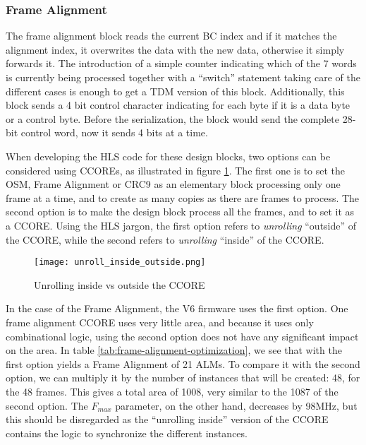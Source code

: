 \subsubsection{Frame Alignment}
The frame alignment block reads the current BC index and if it matches the alignment index, it overwrites the data with the new data, otherwise it simply forwards it. The introduction of a simple counter indicating which of the 7 words is currently being processed together with a ``switch'' statement taking care of the different cases is enough to get a TDM version of this block. Additionally, this block sends a 4 bit control character indicating for each byte if it is a data byte or a control byte. Before the serialization, the block would send the complete 28-bit control word, now it sends 4 bits at a time.

When developing the HLS code for these design blocks, two options can be considered using CCOREs, as illustrated in figure \ref{fig:unrolling-inside-outside}. The first one is to set the OSM, Frame Alignment or CRC9 as an elementary block processing only one frame at a time, and to create as many copies as there are frames to process. The second option is to make the design block process all the frames, and to set it as a CCORE. Using the HLS jargon, the first option refers to \textit{unrolling} ``outside'' of the CCORE, while the second refers to \textit{unrolling} ``inside'' of the CCORE.

\begin{figure}
    \centering
    \texttt{[image: unroll\_inside\_outside.png]}
    \caption{Unrolling inside vs outside the CCORE}
    \label{fig:unrolling-inside-outside}
\end{figure}

In the case of the Frame Alignment, the V6 firmware uses the first option. One frame alignment CCORE uses very little area, and because it uses only combinational logic, using the second option does not have any significant impact on the area. In table \ref{tab:frame-alignment-optimization}, we see that with the first option yields a Frame Alignment of 21 ALMs. To compare it with the second option, we can multiply it by the number of instances that will be created: 48, for the 48 frames. This gives a total area of 1008, very similar to the 1087 of the second option. The \(F_{max}\) parameter, on the other hand, decreases by 98MHz, but this should be disregarded as the ``unrolling inside'' version of the CCORE contains the logic to synchronize the different instances.

